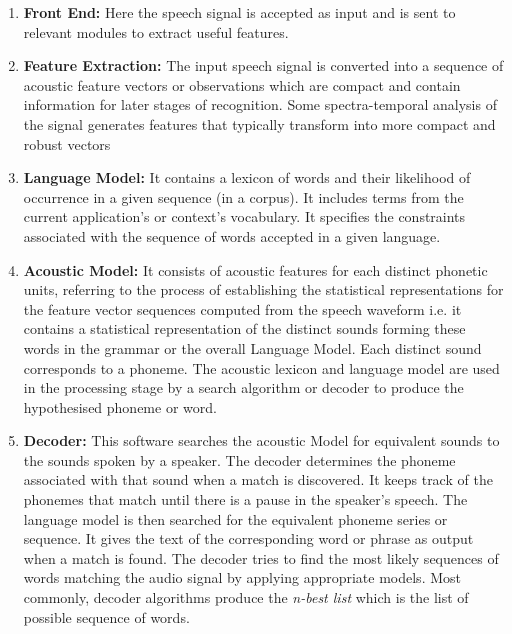 \begin{enumerate}
    \item \textbf{Front End:} Here the speech signal is accepted as input and is sent to relevant modules to extract useful features\cite{s_review_2016}.  
    \item \textbf{Feature Extraction:} The input speech signal is converted into a sequence of acoustic feature vectors or observations which are compact and contain information for later stages of recognition. Some spectra-temporal analysis of the signal generates features that typically transform into more compact and robust vectors %
    \item \textbf{Language Model:} It contains a lexicon of words and their likelihood of occurrence in a given sequence (in a corpus). It includes terms from the current application's or context's vocabulary. It specifies the constraints associated with the sequence of words accepted in a given language. %
    \item \textbf{Acoustic Model:} It consists of acoustic features for each distinct phonetic units, referring to the process of establishing the statistical representations for the feature vector sequences computed from the speech waveform i.e. it contains a statistical representation of the distinct sounds forming these words in the grammar or the overall Language Model. Each distinct sound corresponds to a phoneme. The acoustic lexicon and language model are used in the processing stage by a search algorithm or decoder to produce the hypothesised phoneme or word. %
    \item \textbf{Decoder:} This software searches the acoustic Model for equivalent sounds to the sounds spoken by a speaker. The decoder determines the phoneme associated with that sound when a match is discovered. It keeps track of the phonemes that match until there is a pause in the speaker's speech. The language model is then searched for the equivalent phoneme series or sequence. It gives the text of the corresponding word or phrase as output when a match is found. The decoder tries to find the most likely sequences of words matching the audio signal by applying appropriate models. Most commonly, decoder algorithms produce the \textit{n-best list} which is the list of possible sequence of words. 
\end{enumerate}    
